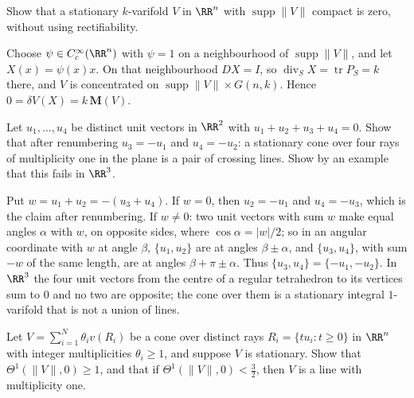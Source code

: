 \begin{exercise}\label{currents:exercise-compact-support}
Show that a stationary $k$-varifold $V$ in $\RR^n$ with $\operatorname{supp}\|V\|$ compact is zero, without using rectifiability.
\end{exercise}

\begin{solution}
Choose $\psi \in C^\infty_c(\RR^n)$ with $\psi = 1$ on a neighbourhood of $\operatorname{supp}\|V\|$, and let $X(x) = \psi(x)x$. On that neighbourhood $DX = I$, so $\operatorname{div}_SX = \operatorname{tr}P_S = k$
there, and $V$ is concentrated on $\operatorname{supp}\|V\| \times G(n, k)$. Hence $0 = \delta V(X) = k\,\mathbf{M}(V)$.
\end{solution}

\begin{exercise}\label{currents:exercise-four-rays}
Let $u_1, \ldots, u_4$ be distinct unit vectors in $\RR^2$ with $u_1 + u_2 + u_3 + u_4 = 0$. Show that after renumbering $u_3 = -u_1$ and $u_4 = -u_2$: a stationary cone over four rays of multiplicity
one in the plane is a pair of crossing lines. Show by an example that this fails in $\RR^3$.
\end{exercise}

\begin{solution}
Put $w = u_1 + u_2 = -(u_3 + u_4)$. If $w = 0$, then $u_2 = -u_1$ and $u_4 = -u_3$, which is the claim after renumbering. If $w \neq 0$: two unit vectors with sum $w$ make equal angles $\alpha$ with $w$, on
opposite sides, where $\cos\alpha = |w|/2$; so in an angular coordinate with $w$ at angle $\beta$, $\{u_1, u_2\}$ are at angles $\beta \pm \alpha$, and $\{u_3, u_4\}$, with sum $-w$ of the same length, are at
angles $\beta + \pi \pm \alpha$. Thus $\{u_3, u_4\} = \{-u_1, -u_2\}$. In $\RR^3$ the four unit vectors from the centre of a regular tetrahedron to its vertices sum to $0$ and no two are opposite; the cone
over them is a stationary integral $1$-varifold that is not a union of lines.
\end{solution}

\begin{exercise}\label{currents:exercise-density-cones}
Let $V = \sum_{i=1}^N\theta_iv(R_i)$ be a cone over distinct rays $R_i = \{tu_i : t \geq 0\}$ in $\RR^n$ with integer multiplicities $\theta_i \geq 1$, and suppose $V$ is stationary. Show that
$\Theta^1(\|V\|, 0) \geq 1$, and that if $\Theta^1(\|V\|, 0) < \frac32$, then $V$ is a line with multiplicity one.
\end{exercise}

